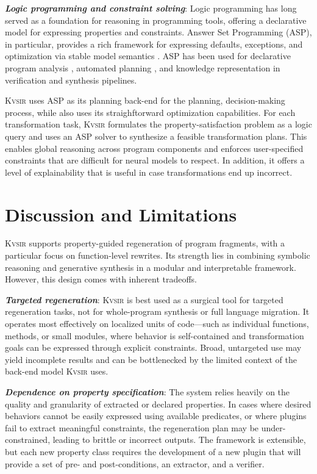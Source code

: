 \documentclass[noacm,sigplan]{acmart}
\newcommand{\sys}{{\scshape Kv{\textalpha}sir}\xspace}
\newcommand{\heading}[1]{\vspace{2pt}\noindent\textbf{\emph{#1}}:\enspace}
\begin{document}
\heading{Logic programming and constraint solving}
Logic programming has long served as a foundation for reasoning in programming
tools, offering a declarative model for expressing properties and constraints.
Answer Set Programming (ASP), in particular, provides a rich framework for
expressing defaults, exceptions, and optimization via stable model semantics
\cite{Gelfond_2000, Gelfond_2002, Eiter_2009}. 
ASP has been used for
declarative program analysis \cite{benton2007interactive}, automated planning
\cite{nguyen2020explainable, son2022answersetplanningsurvey}, and knowledge
representation in verification and synthesis pipelines.

\sys uses ASP as its planning back-end for the planning, decision-making
process, while also uses its straighftorward optimization capabilities.
For each transformation task, \sys formulates the property-satisfaction problem as a logic query and uses an ASP solver to
synthesize a feasible transformation plans.
This enables global reasoning across program components and enforces
user-specified constraints that are difficult for neural models to respect.
In addition, it offers a level of explainability that is useful in case transformations end up incorrect.

\section{Discussion and Limitations}

\sys supports property-guided regeneration of program fragments, with a particular focus on function-level rewrites. Its strength lies in combining symbolic reasoning and generative synthesis in a modular and interpretable framework. However, this design comes with inherent tradeoffs.

\heading{Targeted regeneration}
\sys is best used as a surgical tool for targeted regeneration tasks, not for whole-program synthesis or full language migration.
It operates most effectively on localized units of code---such as individual functions, methods, or small modules, where behavior is self-contained and transformation goals can be expressed through explicit constraints.
Broad, untargeted use may yield incomplete results and can be bottlenecked by the limited context of the back-end model \sys uses.

\heading{Dependence on property specification}
The system relies heavily on the quality and granularity of extracted or declared properties.
In cases where desired behaviors cannot be easily expressed using available predicates, or where plugins fail to extract meaningful constraints, the regeneration plan may be under-constrained, leading to brittle or incorrect outputs. The framework is extensible, but each new property class requires the development of a new plugin that will provide a set of pre- and post-conditions, an extractor, and a verifier.
\end{document}

